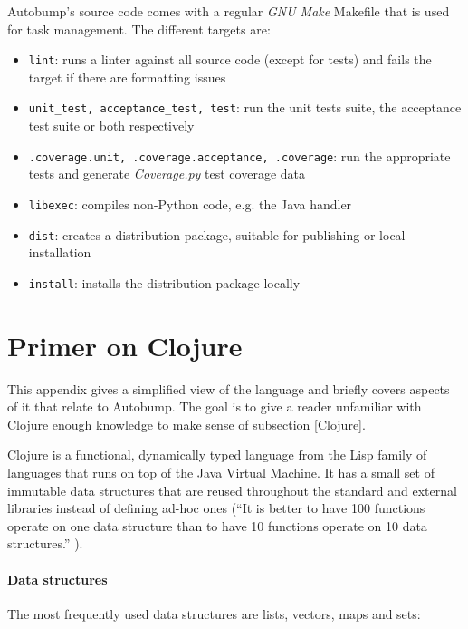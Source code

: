 \documentclass{l4proj}
\newcommand\genericstyle{\lstset{basicstyle=\ttm}}
\newcommand\codeinline[1]{{\genericstyle\lstinline!#1!}}
\begin{document}
\begin{appendices}
Autobump's source code comes with a regular \textit{GNU Make} Makefile
that is used for task management. The different targets are:

\begin{itemize}
\item \codeinline{lint}: runs a linter against all source code (except
for tests) and fails the target if there are formatting issues
\item \codeinline{unit_test, acceptance_test, test}: run the unit
tests suite, the acceptance test suite or both respectively
\item \codeinline{.coverage.unit, .coverage.acceptance, .coverage}:
run the appropriate tests and generate \textit{Coverage.py}
\cite{Coverage} test coverage data
\item \codeinline{libexec}: compiles non-Python code, e.g. the Java handler
\item \codeinline{dist}: creates a distribution package, suitable for
publishing or local installation
\item \codeinline{install}: installs the distribution package locally
\end{itemize}

\chapter{Primer on Clojure}
\label{ClojurePrimer}

This appendix gives a simplified view of the language and briefly
covers aspects of it that relate to Autobump. The goal is to give a
reader unfamiliar with Clojure enough knowledge to make sense of
subsection \ref{Clojure}.

Clojure is a functional, dynamically typed language from the Lisp
family of languages that runs on top of the Java Virtual Machine. It
has a small set of immutable data structures that are reused
throughout the standard and external libraries instead of defining
ad-hoc ones (``It is better to have 100 functions operate on one data
structure than to have 10 functions operate on 10 data
structures.'' \cite{ClojureRationale}).

\subsubsection{Data structures}

The most frequently used data structures are lists, vectors, maps and
sets:


\end{appendices}
\end{document}
